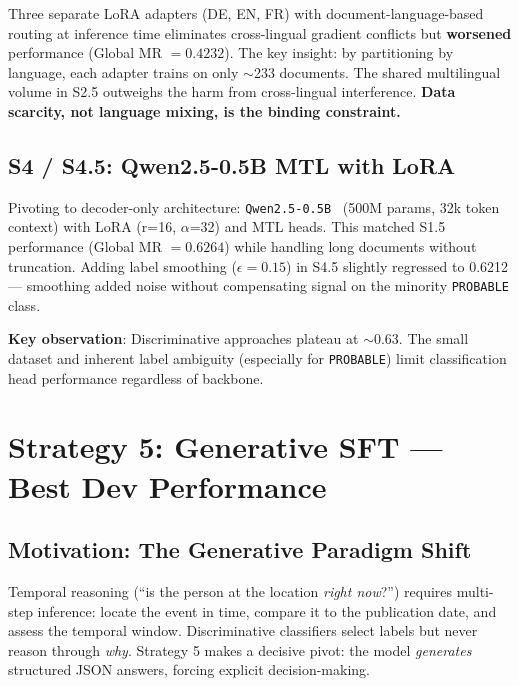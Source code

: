 \documentclass{ceurart}
\begin{document}
Three separate LoRA adapters (DE, EN, FR) with document-language-based routing at inference time eliminates cross-lingual gradient conflicts but \textbf{worsened} performance (Global MR $= 0.4232$). The key insight: by partitioning by language, each adapter trains on only $\sim$233 documents. The shared multilingual volume in S2.5 outweighs the harm from cross-lingual interference. \textbf{Data scarcity, not language mixing, is the binding constraint.}

\subsection{S4 / S4.5: Qwen2.5-0.5B MTL with LoRA}

Pivoting to decoder-only architecture: \texttt{Qwen2.5-0.5B}~\cite{qwen25} (500M params, 32k token context) with LoRA (r=16, $\alpha$=32) and MTL heads. This matched S1.5 performance (Global MR $= 0.6264$) while handling long documents without truncation. Adding label smoothing ($\epsilon=0.15$) in S4.5 slightly regressed to 0.6212 --- smoothing added noise without compensating signal on the minority \texttt{PROBABLE} class.

\textbf{Key observation}: Discriminative approaches plateau at $\sim$0.63. The small dataset and inherent label ambiguity (especially for \texttt{PROBABLE}) limit classification head performance regardless of backbone.

\section{Strategy 5: Generative SFT --- Best Dev Performance}
\label{sec:s5}

\subsection{Motivation: The Generative Paradigm Shift}

Temporal reasoning (``is the person at the location \emph{right now}?'') requires multi-step inference: locate the event in time, compare it to the publication date, and assess the temporal window. Discriminative classifiers select labels but never reason through \emph{why}. Strategy 5 makes a decisive pivot: the model \emph{generates} structured JSON answers, forcing explicit decision-making.
\end{document}
